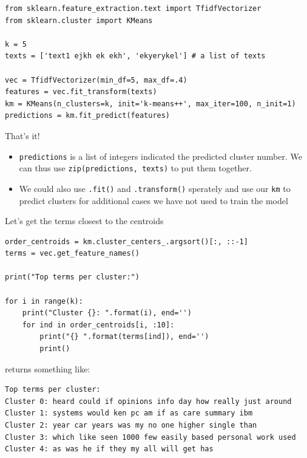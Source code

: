 \documentclass{beamer}
\begin{document}
\begin{frame}
\begin{lstlisting}
from sklearn.feature_extraction.text import TfidfVectorizer
from sklearn.cluster import KMeans

k = 5
texts = ['text1 ejkh ek ekh', 'ekyerykel'] # a list of texts

vec = TfidfVectorizer(min_df=5, max_df=.4)
features = vec.fit_transform(texts)
km = KMeans(n_clusters=k, init='k-means++', max_iter=100, n_init=1)
predictions = km.fit_predict(features)

\end{lstlisting}

That's it!
\pause

\begin{itemize}
	\item \texttt{predictions} is a list of integers indicated the predicted cluster number. We can thus use \texttt{zip(predictions, texts)} to put them together.
	\item<+-> We could also use \texttt{.fit()} and \texttt{.transform()} sperately and use our \texttt{km} to predict clusters for additional cases we have not used to train the model
\end{itemize}

\end{frame}


\begin{frame}{Let's get the terms closest to the centroids}
\begin{lstlisting}
order_centroids = km.cluster_centers_.argsort()[:, ::-1]
terms = vec.get_feature_names()

print("Top terms per cluster:")

for i in range(k):
    print("Cluster {}: ".format(i), end='')
    for ind in order_centroids[i, :10]:
        print("{} ".format(terms[ind]), end='')
        print()
\end{lstlisting}
\pause
returns something like:

\begin{lstlisting}
Top terms per cluster:
Cluster 0: heard could if opinions info day how really just around 
Cluster 1: systems would ken pc am if as care summary ibm 
Cluster 2: year car years was my no one higher single than 
Cluster 3: which like seen 1000 few easily based personal work used 
Cluster 4: as was he if they my all will get has 
\end{lstlisting}
\end{frame}
\end{document}
